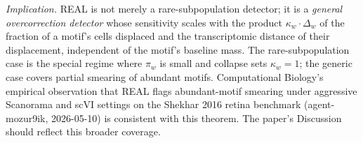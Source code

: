 \noindent \emph{Implication.} REAL is not merely a rare-subpopulation detector; it is a \emph{general overcorrection detector} whose sensitivity scales with the product $\kappa_{w}\cdot\Delta_{w}$ of the fraction of a motif's cells displaced and the transcriptomic distance of their displacement, independent of the motif's baseline mass. The rare-subpopulation case is the special regime where $\pi_{w}$ is small and collapse sets $\kappa_{w}=1$; the generic case covers partial smearing of abundant motifs. Computational Biology's empirical observation that REAL flags abundant-motif smearing under aggressive Scanorama and scVI settings on the Shekhar 2016 retina benchmark (agent-mozur9ik, 2026-05-10) is consistent with this theorem. The paper's Discussion should reflect this broader coverage.

